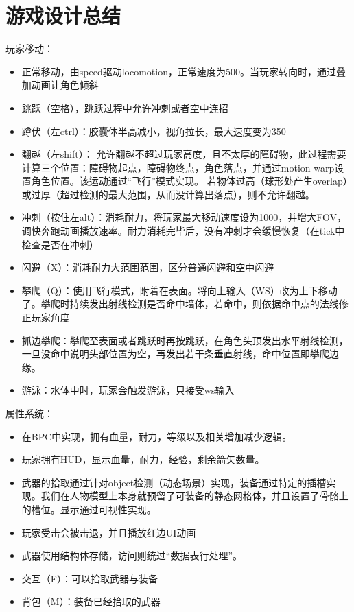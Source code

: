 \documentclass[11pt,oneside]{book}
\begin{document}
\chapter{游戏设计总结}

玩家移动：
\begin{itemize}
    \item  正常移动，由speed驱动locomotion，正常速度为500。当玩家转向时，通过叠加动画让角色倾斜
    \item  跳跃（空格），跳跃过程中允许冲刺或者空中连招
    \item  蹲伏（左ctrl）：胶囊体半高减小，视角拉长，最大速度变为350
    \item  翻越（左shift）： 允许翻越不超过玩家高度，且不太厚的障碍物，此过程需要计算三个位置：障碍物起点，障碍物终点，角色落点，并通过motion warp设置角色位置。该运动通过“飞行”模式实现。
           若物体过高（球形处产生overlap）或过厚（超过检测的最大范围，从而没计算出落点），则不允许翻越。
    \item  冲刺（按住左alt）：消耗耐力，将玩家最大移动速度设为1000，并增大FOV，调快奔跑动画播放速率。耐力消耗完毕后，没有冲刺才会缓慢恢复（在tick中检查是否在冲刺）
    \item  闪避（X）：消耗耐力大范围范围，区分普通闪避和空中闪避
    \item  攀爬（Q）：使用飞行模式，附着在表面。将向上输入（WS）改为上下移动了。攀爬时持续发出射线检测是否命中墙体，若命中，则依据命中点的法线修正玩家角度
    \item  抓边攀爬：攀爬至表面或者跳跃时再按跳跃，在角色头顶发出水平射线检测，一旦没命中说明头部位置为空，再发出若干条垂直射线，命中位置即攀爬边缘。
    \item  游泳：水体中时，玩家会触发游泳，只接受ws输入
\end{itemize}

属性系统：
\begin{itemize}
    \item 在BPC中实现，拥有血量，耐力，等级以及相关增加减少逻辑。
    \item 玩家拥有HUD，显示血量，耐力，经验，剩余箭矢数量。
    \item 武器的拾取通过针对object检测（动态场景）实现，装备通过特定的插槽实现。我们在人物模型上本身就预留了可装备的静态网格体，并且设置了骨骼上的槽位。显示通过可视性实现。
    \item 玩家受击会被击退，并且播放红边UI动画
    \item 武器使用结构体存储，访问则统过“数据表行处理”。
    \item 交互（F）：可以拾取武器与装备
    \item 背包（M）：装备已经拾取的武器
\end{itemize}
\end{document}
